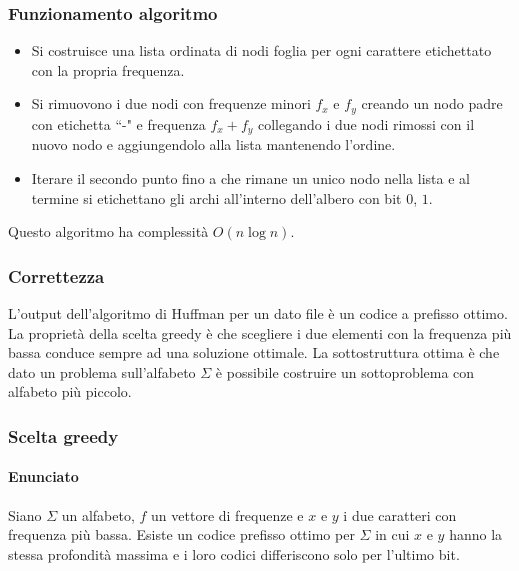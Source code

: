 	\subsubsection{Funzionamento algoritmo}
	\begin{itemize}
		\item Si costruisce una lista ordinata di nodi foglia per ogni carattere etichettato con la propria frequenza.
		\item Si rimuovono i due nodi con frequenze minori $f_x$ e $f_y$ creando un nodo padre con etichetta ``-" e frequenza $f_x+f_y$ collegando i due nodi rimossi con il nuovo nodo e
			aggiungendolo alla lista mantenendo l'ordine.
		\item Iterare il secondo punto fino a che rimane un unico nodo nella lista e al termine si etichettano gli archi all'interno dell'albero con bit $0$, $1$.
	\end{itemize}
	
	Questo algoritmo ha complessit\`a $O(n\log n)$. 
	\subsubsection{Correttezza}
	L'output dell'algoritmo di Huffman per un dato file \`e un codice a prefisso ottimo. La propriet\`a della scelta greedy \`e che scegliere i due elementi con la frequenza pi\`u bassa 
	conduce sempre ad una soluzione ottimale. La sottostruttura ottima \`e che dato un problema sull'alfabeto $\Sigma$ \`e possibile costruire un sottoproblema con alfabeto pi\`u piccolo. 
	\subsubsection{Scelta greedy}
	\paragraph{Enunciato} 
	Siano $\Sigma$ un alfabeto, $f$ un vettore di frequenze e $x$ e $y$ i due caratteri con frequenza pi\`u bassa. Esiste un codice prefisso ottimo per $\Sigma$ in cui $x$ e $y$ hanno la
	stessa profondit\`a massima e i loro codici differiscono solo per l'ultimo bit. 
